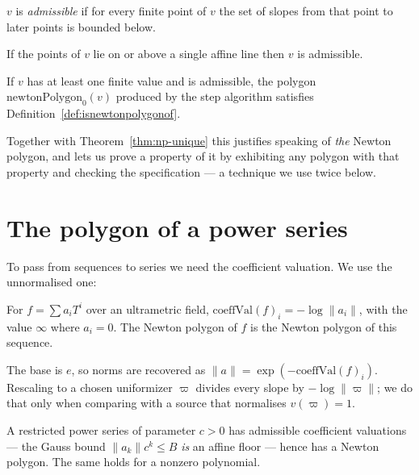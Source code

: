 \begin{definition}
  \label{def:isadmissible}
  \leanok
  $v$ is \emph{admissible} if for every finite point of $v$ the set of slopes from that point to
  later points is bounded below.
\end{definition}

\begin{lemma}
  \label{lem:isadmissible-affine}
  \leanok
  If the points of $v$ lie on or above a single affine line then $v$ is admissible.
\end{lemma}

\begin{theorem}[Existence]
  \label{thm:np-exists}
  \leanok
  If $v$ has at least one finite value and is admissible, the polygon $\mathrm{newtonPolygon}_0(v)$
  produced by the step algorithm satisfies Definition~\ref{def:isnewtonpolygonof}.
\end{theorem}

Together with Theorem~\ref{thm:np-unique} this justifies speaking of \emph{the} Newton polygon,
and lets us prove a property of it by exhibiting any polygon with that property and checking the
specification --- a technique we use twice below.

\section{The polygon of a power series}

To pass from sequences to series we need the coefficient valuation.  We use the unnormalised one:

\begin{definition}
  \label{def:coeffval}
  \leanok
  For $f = \sum a_i T^i$ over an ultrametric field, $\mathrm{coeffVal}(f)_i = -\log \lVert a_i
  \rVert$, with the value $\infty$ where $a_i = 0$.  The Newton polygon of $f$ is the Newton
  polygon of this sequence.
\end{definition}

The base is $e$, so norms are recovered as $\lVert a \rVert = \exp(-\mathrm{coeffVal}(f)_i)$.
Rescaling to a chosen uniformizer $\varpi$ divides every slope by $-\log\lVert \varpi \rVert$;
we do that only when comparing with a source that normalises $v(\varpi) = 1$.

\begin{lemma}
  \label{lem:np-restricted}
  \leanok
  A restricted power series of parameter $c > 0$ has admissible coefficient valuations --- the
  Gauss bound $\lVert a_k \rVert c^k \leq B$ \emph{is} an affine floor --- hence has a Newton
  polygon.  The same holds for a nonzero polynomial.
\end{lemma}

